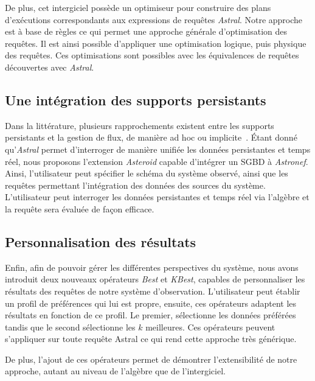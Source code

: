 De plus, cet intergiciel possède un optimiseur pour construire des plans d'exécutions correspondants aux expressions de requêtes \textit{Astral}. Notre approche est à base de règles ce qui permet une approche générale d'optimisation des requêtes. Il est ainsi possible d'appliquer une optimisation logique, puis physique des requêtes. Ces optimisations sont possibles avec les équivalences de requêtes découvertes avec \textit{Astral}.

\subsection{Une intégration des supports persistants}
Dans la littérature, plusieurs rapprochements existent entre les supports persistants et la gestion de flux, de manière ad hoc ou implicite~\cite{Balazinska:moirae,Reiss:fastbit}. Étant donné qu'\textit{Astral} permet d'interroger de manière unifiée les données persistantes et temps réel, nous proposons l'extension \textit{Asteroid} capable d'intégrer un SGBD à \textit{Astronef}. Ainsi, l'utilisateur peut spécifier le schéma du système observé, ainsi que les requêtes permettant l'intégration des données des sources du système. L'utilisateur peut interroger les données persistantes et temps réel via l'algèbre et la requête sera évaluée de façon efficace.

\subsection{Personnalisation des résultats}
Enfin, afin de pouvoir gérer les différentes perspectives du système, nous avons introduit deux nouveaux opérateurs \textit{Best} et \textit{KBest}, capables de personnaliser les résultats des requêtes de notre système d'observation. L'utilisateur peut établir un profil de préférences qui lui est propre, ensuite, ces opérateurs adaptent les résultats en fonction de ce profil. Le premier, sélectionne les données préférées tandis que le second sélectionne les $k$ meilleures. Ces opérateurs peuvent s'appliquer sur toute requête Astral ce qui rend cette approche très générique.

De plus, l'ajout de ces opérateurs permet de démontrer l'extensibilité de notre approche, autant au niveau de l'algèbre que de l'intergiciel.
